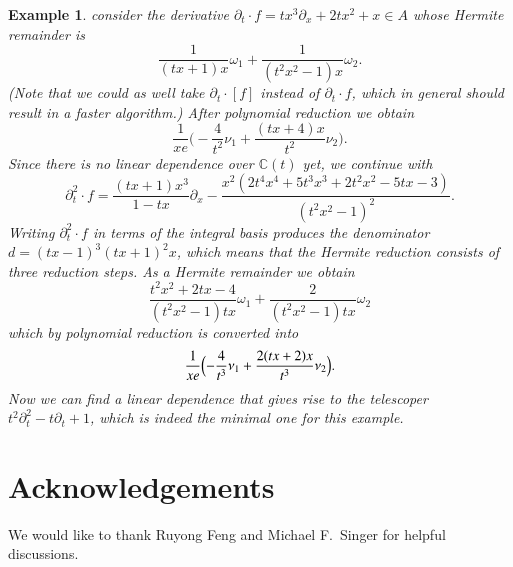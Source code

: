 \documentclass[final,1p,times,authoryear]{elsarticle}
\newtheorem{example}[theorem]{Example}
\newcommand{\bC}{ {\mathbb C}}
\begin{document}
\begin{example}
consider the derivative $\partial_t\cdot f=tx^3\partial_x+2tx^2+x\in A$ whose
Hermite remainder is
\[
  \frac{1}{(tx+1)x} \omega_1 + \frac{1}{(t^2x^2-1)x} \omega_2.
\]
(Note that we could as well take $\partial_t\cdot [f]$ instead of $\partial_t\cdot f$, which
in general should result in a faster algorithm.)
After polynomial reduction we obtain
\[
  \frac{1}{xe} \biggl( -\frac{4}{t^2} \nu_1 + \frac{(tx+4)x}{t^2} \nu_2 \biggr).
\]
Since there is no linear dependence over $\bC(t)$ yet, we continue with
\[
  \partial_t^2\cdot f =
  \frac{(tx+1)x^3}{1-tx} \partial_x -
  \frac{x^2(2t^4x^4+5t^3x^3+2t^2x^2-5tx-3)}{(t^2x^2-1)^2}.
\]
Writing $\partial_t^2\cdot f$ in terms of the integral basis produces the denominator
$d=(tx-1)^3(tx+1)^2x$, which means that the Hermite reduction consists of three
reduction steps. As a Hermite remainder we obtain
\[
  \frac{t^2x^2+2tx-4}{(t^2x^2-1)tx} \omega_1 + \frac{2}{(t^2x^2-1)tx} \omega_2
\]
which by polynomial reduction is converted into
\[
  \frac{1}{xe} \Bigl( -\frac{4}{t^3} \nu_1 + \frac{2(tx+2)x}{t^3} \nu_2 \Bigr).
\]
Now we can find a linear dependence that gives rise to the telescoper
$t^2\partial_t^2-t\partial_t+1$, which is indeed the minimal one for this example.
\end{example}

\section*{Acknowledgements}

We would like to thank Ruyong Feng and Michael F.\ Singer for helpful discussions.



\end{document}
